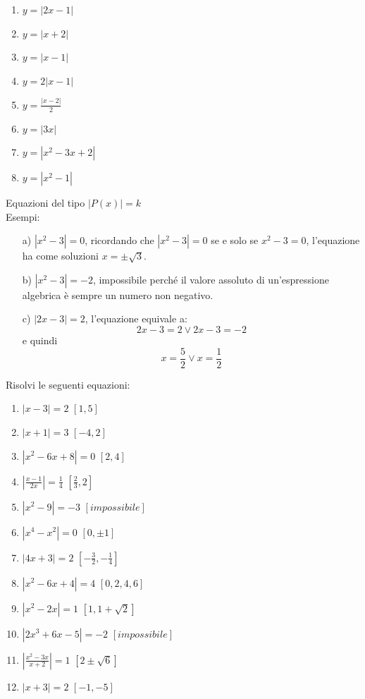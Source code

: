 \begin{enumerate}
        \item $y=|2x-1|$
        \item $y=|x+2|$
        \item $y=|x-1|$
        \item $y=2|x-1|$
        \item $y=\frac{|x-2|}{2}$
        \item $y=|3x|$
        \item $y=|x^2-3x+2|$
        \item $y=|x^2-1|$
\end{enumerate}
Equazioni del tipo $|P(x)|=k$\\
Esempi:
\begin{enumerate}
\item[a)] $|x^2-3|=0$, ricordando che $|x^2-3|=0$ se e solo se $x^2-3=0$, 
l'equazione ha come soluzioni $x=\pm\sqrt{3}$.
\item[b)] $|x^2-3|=-2$, impossibile perché il valore assoluto di un'espressione 
algebrica è sempre un numero non negativo.
\item[c)] $|2x-3|=2$, l'equazione equivale a:
$$2x-3=2 \vee 2x-3=-2$$
e quindi
$$x=\frac{5}{2}\vee x=\frac{1}{2}$$
\end{enumerate}
Risolvi le seguenti equazioni:

\begin{enumerate}
        \item $|x-3|=2$ \hfill $\left[ 1, 5\right] $
        \item $|x+1|=3$ \hfill $\left[ -4, 2\right] $
        \item $|x^2-6x+8|=0$ \hfill $\left[ 2, 4\right] $
        \item $\left| \frac{x-1}{2x}\right| =\frac{1}{4}$ \hfill $\left[ 
\frac{2}{3}, 2\right] $
                \item $|x^2-9|=-3$ \hfill $\left[impossibile \right] $
                \item $|x^4-x^2|=0$ \hfill $\left[ 0, \pm 1\right] $
                \item $|4x+3|=2$ \hfill $\left[ -\frac{3}{2}, -\frac{1}{4} 
\right] $
                \item $|x^2-6x+4|=4$ \hfill $\left[ 0, 2, 4 , 6 \right] $
                \item $|x^2-2x|=1$ \hfill $\left[ 1, 1+\sqrt{2} \right] $
                \item $|2x^3+6x-5|=-2$ \hfill $\left[ impossibile \right] $
                \item $\left| \frac{x^2-3x}{x+2}\right| =1$ \hfill $\left[ 2\pm 
\sqrt{6} \right] $
                \item $|x+3|=2$ \hfill $\left[ -1, -5 \right] $
\end{enumerate}



